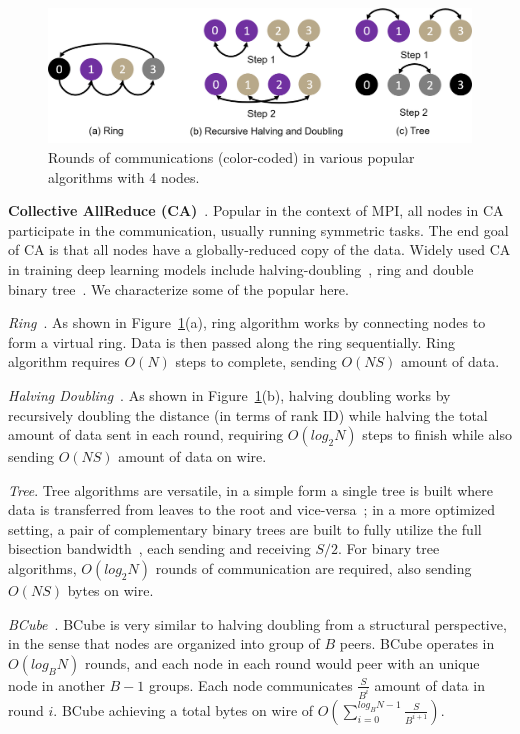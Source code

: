 \begin{figure}[t!]
	\centering
	\includegraphics[width=.6\linewidth]{Figures/collectivesAlgorithms.png}
	\caption{Rounds of communications (color-coded) in various popular \collectives algorithms with 4 nodes.}
	\label{fig:collectivesAlgorithm}
\end{figure}

\noindent\textbf{Collective AllReduce (CA)}~\cite{Sack:2011:SCM:2522220,Thakur:2005:OCC:2747766.2747771,collectivesOptimization,blum2000architectures,bala1995ccl}. Popular in the context of MPI, all nodes in CA participate in the communication, usually running symmetric tasks. The end goal of CA is that all nodes have a globally-reduced copy of the data. Widely used CA in training deep learning models include halving-doubling~\cite{ImageNetIn1Hour}, ring and double binary tree~\cite{Operatio73:online, Sergeev2018HorovodFA}. We characterize some of the popular \cmpi here.

\noindent\textit{Ring}~\cite{patarasuk2009bandwidth}. As shown in Figure~\ref{fig:collectivesAlgorithm}(a), ring algorithm works by connecting nodes to form a virtual ring. Data is then passed along the ring sequentially. Ring algorithm requires $O(N)$ steps to complete, sending $O(NS)$ amount of data.

\noindent\textit{Halving Doubling}~\cite{Thakur:2005:OCC:2747766.2747771}. As shown in Figure~\ref{fig:collectivesAlgorithm}(b), halving doubling works by recursively doubling the distance (in terms of rank ID) while halving the total amount of data sent in each round, requiring $O(log_{2}{N})$ steps to finish while also sending $O(NS)$ amount of data on wire.

\noindent\textit{Tree}. Tree algorithms are versatile, in a simple form a single tree is built where data is transferred from leaves to the root and vice-versa~\cite{firecaffe}; in a more optimized setting, a pair of complementary binary trees are built to fully utilize the full bisection bandwidth~\cite{dbt}, each sending and receiving $S/2$. For binary tree \collectives algorithms, $O(log_2N)$ rounds of communication are required, also sending $O(NS)$ bytes on wire. 

\noindent\textit{BCube}~\cite{glooalgo70:online}. BCube is very similar to halving doubling from a structural perspective, in the sense that nodes are organized into group of $B$ peers. BCube operates in $O(log_BN)$ rounds, and each node in each round would peer with an unique node in another $B-1$ groups. Each node communicates $\frac{S}{B^i}$ amount of data in round $i$. BCube achieving a total bytes on wire of $O(\sum_{i=0}^{log_BN-1}\frac{S}{B^{i+1}})$.

